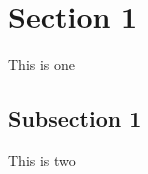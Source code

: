 \documentclass[a4paper]{article}
\begin{document}
\tableofcontents

\section{Section 1}

This is one

\subsection{Subsection 1}

This is two
\end{document}
